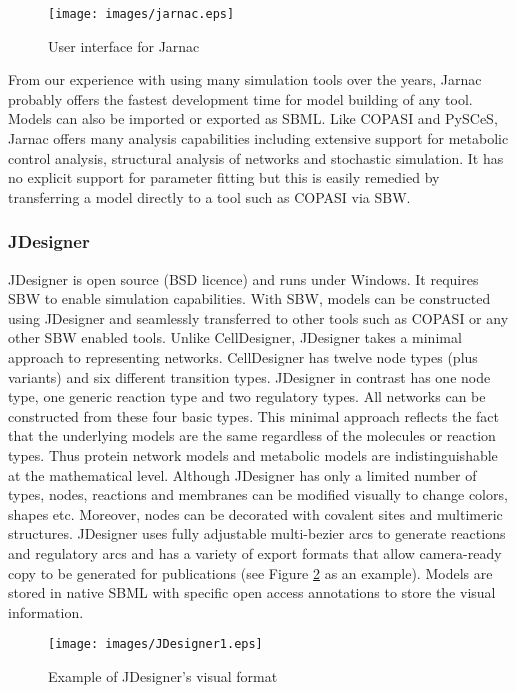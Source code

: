 \begin{figure}[htbp]
\centering
\texttt{[image: images/jarnac.eps]}
\caption{User interface for Jarnac\label{Figure:jarnac}}
\end{figure}

From our experience with using many simulation tools over the years,
Jarnac probably offers the fastest development time for model building
of any tool. Models can also be imported or exported as SBML. Like
COPASI and PySCeS, Jarnac offers many analysis capabilities including
extensive support for metabolic control analysis, structural analysis of
networks and stochastic simulation. It has no explicit support for
parameter fitting but this is easily remedied by transferring a model
directly to a tool such as COPASI via SBW.

\subsubsection{JDesigner}

JDesigner \autocite{BergmannCP:2006} is open
source (BSD licence) and runs under Windows. It requires SBW to enable
simulation capabilities. With SBW, models can be constructed using
JDesigner and seamlessly transferred to other tools such as COPASI or
any other SBW enabled tools. Unlike CellDesigner, JDesigner takes a
minimal approach to representing networks. CellDesigner has twelve node
types (plus variants) and six different transition types. JDesigner in
contrast has one node type, one generic reaction type and two regulatory
types. All networks can be constructed from these four basic types. This
minimal approach reflects the fact that the underlying models are the
same regardless of the molecules or reaction types. Thus protein network
models and metabolic models are indistinguishable at the mathematical
level. Although JDesigner has only a limited number of types, nodes,
reactions and membranes can be modified visually to change colors,
shapes etc. Moreover, nodes can be decorated with covalent sites and
multimeric structures. JDesigner uses fully adjustable multi-bezier arcs
to generate reactions and regulatory arcs and has a variety of export
formats that allow camera-ready copy to be generated for publications
(see Figure \ref{Figure:jdesigner} as an example). Models are stored in
native SBML with specific open access annotations to store the visual
information.

\begin{figure}[htbp]
\centering
\texttt{[image: images/JDesigner1.eps]}
\caption{Example of JDesigner's visual format\label{Figure:jdesigner}}
\end{figure}

